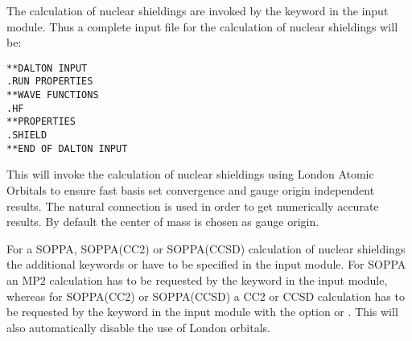 \begin{center}
\end{center}


The calculation of nuclear shieldings are
invoked by the
keyword  in the  input module. Thus
a complete input file for the calculation of nuclear shieldings will
be:

\begin{verbatim}
**DALTON INPUT
.RUN PROPERTIES
**WAVE FUNCTIONS
.HF
**PROPERTIES
.SHIELD
**END OF DALTON INPUT
\end{verbatim}

This will invoke the calculation of nuclear shieldings using
London Atomic Orbitals to ensure fast basis set
convergence and gauge
origin independent results. The natural connection
\cite{joklbkrthpjtca90}
is used in order to get
numerically accurate results. By default the center of mass is chosen as gauge
origin.

For a SOPPA, SOPPA(CC2) or
SOPPA(CCSD) calculation of nuclear shieldings the
additional keywords  or  have to be
specified in the  input module. For SOPPA an MP2
calculation has to be requested by the keyword  in the
 input module, whereas for SOPPA(CC2) or
SOPPA(CCSD) a CC2 or CCSD calculation has to be requested by the
keyword  in the  input module with the  option
 or . This will also automatically disable
the use of London orbitals.



